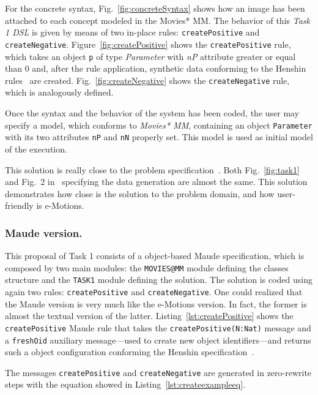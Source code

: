 \documentclass[draft]{llncs}
\newcommand{\code}[1]{{\texttt{#1}}}
\begin{document}
For the concrete syntax, Fig.~\ref{fig:concreteSyntax} shows how an image has been attached to each concept modeled in the Movies* MM. The behavior of this \textit{Task 1 DSL} is given by means of two in-place rules: \code{createPositive} and \code{createNegative}. Figure~\ref{fig:createPositive} shows the \code{createPositive} rule, which takes an object \code{p} of type \textit{Parameter} with \textit{nP} attribute greater or equal than $0$ and, after the rule application, synthetic data conforming to the Henshin rules~\cite{henshing} are created. Fig.~\ref{fig:createNegative} shows the \code{createNegative} rule, which is analogously defined.

Once the syntax and the behavior of the system has been coded, the user may specify a model, which conforms to \textit{Movies* MM}, containing an object \code{Parameter} with its two attributes \code{nP} and \code{nN} properly set. This model is used as initial model of the execution.

This solution is really close to the problem specification~\cite{imdbcase}. Both Fig.~\ref{fig:task1} and Fig.~2 in~\cite{imdbcase} specifying the data generation are almost the same. This solution demonstrates how close is the solution to the problem domain, and how user-friendly is e-Motions.

\subsubsection{Maude version.}
This proposal of Task 1 consists of a object-based Maude specification, which is composed by two main modules: the \code{MOVIES@MM} module defining the classes structure and the \code{TASK1} module defining the solution. The solution is coded using again two rules: \code{createPositive} and \code{createNegative}. One could realized that the Maude version is very much like the e-Motions version. In fact, the former is almost the textual version of the latter. Listing~\ref{lst:createPositive} shows the \code{createPositive} Maude rule that takes the \code{createPositive(N:Nat)} message and a \code{freshOid} auxiliary message---used to create new object identifiers---and returns such a object configuration conforming the Henshin specification~\cite{imdbcase}.

The messages \code{createPositive} and \code{createNegative} are generated in zero-rewrite steps with the equation showed in Listing~\ref{lst:createexampleeq}.
\end{document}
